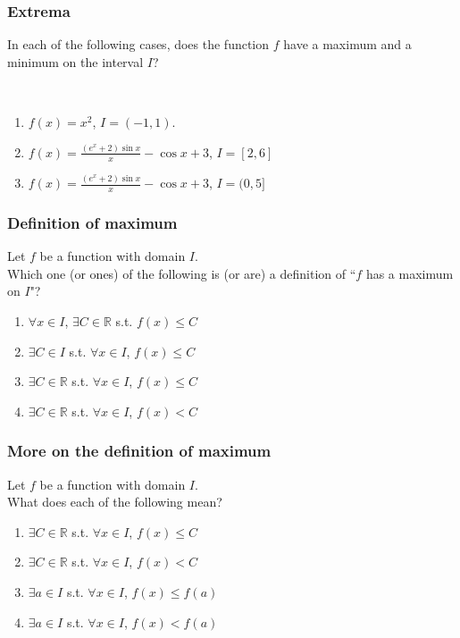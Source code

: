 \documentclass[14pt]{beamer}
\newcommand {\DS} [1] {${\displaystyle #1}$}
\newcommand {\R}{\mathbb{R}}
\begin{document}
\begin{frame}
\frametitle{Extrema}

In each of the following cases, does the function $f$ have a maximum and a minimum on the interval $I$?

\

\begin{enumerate}
	\item  \DS{f(x) = x^2}, \quad \DS{I = (-1,1)}.
	\item   \DS{f(x) = \frac{(e^x + 2) \sin x}{x} - \cos x + 3 }, \quad  \DS{I = [2,6]}
	\item   \DS{f(x) = \frac{(e^x + 2) \sin x}{x} - \cos x + 3 }, \quad  \DS{I = (0,5]}
\end{enumerate}



\end{frame}
\begin{frame}
\frametitle{Definition of maximum}

Let $f$ be a function with domain $I$.  \\
Which one (or ones) of the following is (or are) a definition of 	\quad
	``$f$ has a maximum on $I$"?

\begin{enumerate}
	\item   \DS{\forall x \in I}, \DS{\exists C \in \R} s.t. \DS{f(x) \leq C}
	\item  \DS{\exists C \in I} s.t. \DS{\forall x \in I}, \DS{f(x) \leq C}
	\item  \DS{\exists C \in \R} s.t. \DS{\forall x \in I}, \DS{f(x) \leq C}
	\item  \DS{\exists C \in \R} s.t. \DS{\forall x \in I}, \DS{f(x) < C}
\end{enumerate}

\end{frame}
\begin{frame}
\frametitle{More on the definition of maximum}


Let $f$ be a function with domain $I$.  \\
What does each of the following mean?

\begin{enumerate}
	\item  \DS{\exists C \in \R} s.t. \DS{\forall x \in I}, \DS{f(x) \leq C}
	\item  \DS{\exists C \in \R} s.t. \DS{\forall x \in I}, \DS{f(x) < C}
	\item  \DS{\exists a \in I} s.t. \DS{\forall x \in I}, \DS{f(x) \leq f(a)}
	\item  \DS{\exists a \in I} s.t. \DS{\forall x \in I}, \DS{f(x) < f(a)}
\end{enumerate}

\end{frame}


\end{document}
